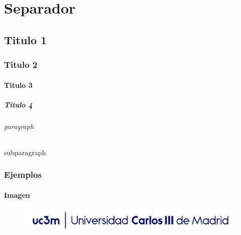\documentclass[12pt]{report} %
\begin{document}
\listoffigures
\thispagestyle{fancy}

\listoftables
\thispagestyle{fancy}

\clearpage
{} %




\part{Separador}
\chapter{Titulo 1}
\section{Titulo 2}
\subsection{Titulo 3}
\subsubsection{Titulo 4}
\paragraph{paragraph}
\subparagraph{subparagraph} 

\newpage

\section{Ejemplos}

\subsection{Imagen}
\begin{figure}[H]
	{\includegraphics[scale=.8]{Portada_Logo.png}}
\end{figure}
\end{document}
